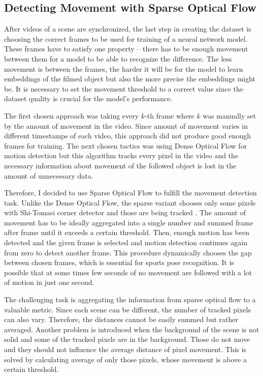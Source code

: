 \subsection{\label{sec:motion-detect}Detecting Movement with Sparse Optical Flow}

After videos of a scene are synchronized, the last step in creating the dataset is choosing the correct frames to be used for training of a neural network model. These frames have to satisfy one property -- there has to be enough movement between them for a model to be able to recognize the difference. The less movement is between the frames, the harder it will be for the model to learn embeddings of the filmed object but also the more precise the embeddings might be. It is necessary to set the movement threshold to a correct value since the dataset quality is crucial for the model's performance.

The first chosen approach was taking every $k$-th frame where $k$ was manually set by the amount of movement in the video. Since amount of movement varies in different timestamps of each video, this approach did not produce good enough frames for training. The next chosen tactics was using Dense Optical Flow for motion detection but this algorithm tracks every pixel in the video and the necessary information about movement of the followed object is lost in the amount of unnecessary data.

Therefore, I decided to use Sparse Optical Flow to fulfill the movement detection task. Unlike the Dense Optical Flow, the sparse variant chooses only some pixels with Shi-Tomasi corner detector and those are being tracked \cite{shi-tomasi-323794}. The amount of movement has to be ideally aggregated into a single number and summed frame after frame until it exceeds a certain threshold. Then, enough motion has been detected and the given frame is selected and motion detection continues again from zero to detect another frame. This procedure dynamically chooses the gap between chosen frames, which is essential for sports pose recognition. It is possible that at some times few seconds of no movement are followed with a lot of motion in just one second.

The challenging task is aggregating the information from sparse optical flow to a valuable metric. Since each scene can be different, the number of tracked pixels can also vary. Therefore, the distances cannot be easily summed but rather averaged. Another problem is introduced when the background of the scene is not solid and some of the tracked pixels are in the background. Those do not move and they should not influence the average distance of pixel movement. This is solved by calculating average of only those pixels, whose movement is above a certain threshold.

